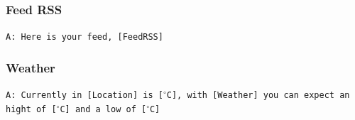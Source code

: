 \subsubsection{Feed RSS}
\texttt{A: Here is your feed, [FeedRSS]}

\subsubsection{Weather}
\texttt{A: Currently in [Location] is [$^\circ$C], with [Weather] you can expect an hight of [$^\circ$C] and a low of [$^\circ$C]}


